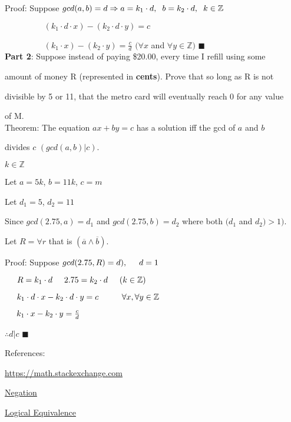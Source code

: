 \documentclass{article}
\begin{document}
Proof: Suppose $gcd(a,b) = d \Rightarrow a = k_1 \cdot d, \hspace{0.2cm} b = k_2 \cdot d, \hspace{0.2cm} k \in \mathbb{Z}$ 

$\hspace{2cm} (k_1 \cdot d \cdot x) - (k_2 \cdot d \cdot y) = c$

$\hspace{2cm} (k_1 \cdot x) - (k_2 \cdot y) = \frac{c}{d}$ \hspace{1cm} $(\forall x$ and $\forall y \in \mathbb{Z})$ $\blacksquare$ \\

\textbf{Part 2}: Suppose instead of paying \$20.00, every time I refill using some

amount of money R (represented in \textbf{cents}). Prove that so long as R is not

divisible by 5 or 11, that the metro card will eventually reach 0 for any value 

of M. \\

Theorem: The equation $ax+by=c$ has a solution iff the gcd of $a$ and $b$ 

divides $c$ $(gcd(a,b)|c)$.

$k \in \mathbb{Z}$

Let $a=5k$, $b=11k$, $c=m$

Let $d_1 = 5$, $d_2 = 11$

Since $gcd(2.75, a) = d_1$ and $gcd(2.75, b) = d_2$ where both $(d_1$ and $d_2) > 1)$.

Let $R = \forall r$ that is $(\overline{a} \land \overline{b})$.

Proof: Suppose $gcd(2.75, R) = d), \hspace{0.5cm} d=1$

$\hspace{0.5cm} R = k_1 \cdot d \hspace{0.5cm} 2.75 = k_2 \cdot d \hspace{0.5cm} (k \in \mathbb{Z})$

$\hspace{0.5cm} k_1 \cdot d \cdot x - k_2 \cdot d \cdot y = c \hspace{1cm} \forall x, \forall y \in \mathbb{Z}$

$\hspace{0.5cm} k_1 \cdot x - k_2 \cdot y = \frac{c}{d}$

$\therefore d|c$ $\blacksquare$

References:

\href{https://math.stackexchange.com/questions/304217/is-forall-x-exists-y-qx-y-the-same-as-exists-y-forall-x-qx-y}{https://math.stackexchange.com}

\href{https://www.math.toronto.edu/preparing-for-calculus/3_logic/we_3_negation.html}{Negation}

\href{https://www.csm.ornl.gov/~sheldon/ds/sec1.1.html}{Logical Equivalence}
\end{document}
